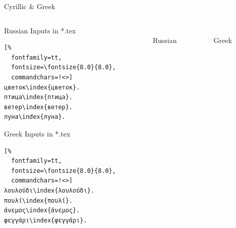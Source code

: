 \documentclass[aspectratio=169,10pt]{beamer}
\begin{document}
\begin{frame}[fragile]{Cyrillic \& Greek}

\begin{columns}
\begin{column}{46mm}

\setmonofont{Noto Sans Mono}
\begin{exampleblock}{Russian Inputs in *.tex}
\begin{Verbatim}[%
  fontfamily=tt,
  fontsize=\fontsize{8.0}{8.0},
  commandchars=!<>]
цветок\index{цветок}.
птица\index{птица}.
ветер\index{ветер}.
луна\index{луна}.
\end{Verbatim}
\end{exampleblock}

\begin{exampleblock}{Greek Inputs in *.tex}
\begin{Verbatim}[%
  fontfamily=tt,
  fontsize=\fontsize{8.0}{8.0},
  commandchars=!<>]
λουλούδι\index{λουλούδι}.
πουλί\index{πουλί}.
άνεμος\index{άνεμος}.
φεγγάρι\index{φεγγάρι}.
\end{Verbatim}
\end{exampleblock}
\end{column}

\begin{column}{43mm}
\begin{center}
\\[2mm]%
Russian
\end{center}
\end{column}

\begin{column}{38mm}
\begin{center}
\\[2mm]%
Greek
\end{center}
\end{column}
\end{columns}

\end{frame}

\end{document}
